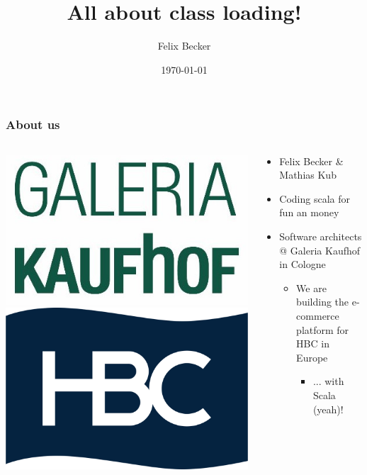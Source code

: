 \documentclass[aspectratio=169]{beamer}
\title{All about class loading!}
\author{Felix Becker}
\date{\today}
\institute{Amsterdam.scala}
\begin{document}
\maketitle

\begin{frame}
	\frametitle{About us}
	\begin{columns}[T] 
		\begin{column}{.20\textwidth}
			\includegraphics[scale=0.16]{assets/kaufhof}
			\\
			\includegraphics[scale=0.06]{assets/hbc}
		\end{column}
		\hfill
		\begin{column}{.80\textwidth}
			\begin{itemize}
				\item{Felix Becker \& Mathias Kub}
				\item{Coding scala for fun an money}
				\item{Software architects @ Galeria Kaufhof in Cologne}
				\begin{itemize}
					\item{We are building the e-commerce platform for HBC in Europe}
					\begin{itemize}
						\item{... with Scala (yeah)!}
					\end{itemize}
				\end{itemize}
			\end{itemize}
		\end{column}
	\end{columns}
\end{frame}
\end{document}
